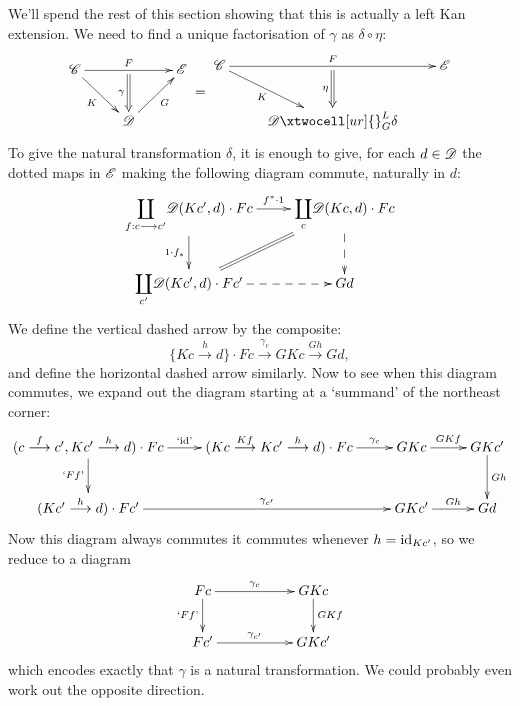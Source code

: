 \documentclass[11pt]{article}
\begin{document}
\begin{2. Kan Extensions}
We'll spend the rest of this section showing that this is actually a left Kan extension. We need %
to find a unique factorisation of $\gamma$ as $\delta\circ\eta$:
\[\vcenter{\xymatrix{
\scrC\ar[rd]_-{K}\ar[rr]^-{F}_-{}="arF"&%
&%
\scrE\\%
&%
\scrD\ar@{=>}"arF";[]_-{\gamma}
\ar[ur]_-{G}
}}
=
\vcenter{\xymatrix{
\scrC\ar[rd]_-{K}\ar[rr]^-{F}_-{}="arF"&%
&%
\scrE\\%
&%
\scrD\ar@{=>}"arF";[]_-{\eta}
\xtwocell[ur]{}_{G}^{L}{{\delta}}&%
}}
\]
To give the natural transformation $\delta$, it is enough to give, for each $d\in\mathscr{D}$ the dotted maps in $\mathscr{E}$ making the following diagram commute, naturally in $d$:
\[\vcenter{\xymatrix{
{\displaystyle\coprod_{f:c\to c'}}\scrD(Kc',d)\cdot Fc\ar[r]^-{f^*\cdot1}\ar[d]_-{1\cdot f_*}&%
\ar@{-->}[d]{\displaystyle\coprod_{c}}\scrD(Kc,d)\cdot Fc\ar@{=}[ld]\\%
\ar@{-->}[r]{\displaystyle\coprod_{c'}}\scrD(Kc',d)\cdot Fc'&%
Gd%
}}\]
We define the vertical dashed arrow by the composite:
\[\{Kc\overset{h}{\to}d\}\cdot Fc\overset{\gamma_c}{\to}GKc\overset{Gh}{\to}Gd,\]
and define the horizontal dashed arrow similarly. Now to see when this diagram commutes, we expand out the diagram starting at a `summand' of the northeast corner:
\[\vcenter{\xymatrix{
(c\overset{f}{\to}c',Kc'\overset{h}{\to}d)\cdot Fc\ar@{->}[r]^-{\textup{`id'}}
\ar[d]_-{\textup{`$Ff$'}}&%
\ar@{->}[r]^-{\gamma_c}(Kc\overset{Kf}{\to}Kc'\overset{h}{\to}d)\cdot Fc&%
GKc\ar[r]^-{GKf}&
GKc'\ar[d]^-{Gh}\\
\ar@{->}[rr]^-{\gamma_{c'}}(Kc'\overset{h}{\to}d)\cdot Fc'&&
GKc'\ar[r]^-{Gh}&Gd
}}\]
Now this diagram always commutes \Iff it commutes whenever $h=\textup{id}_{Kc'}$, so we reduce to a diagram
\[\vcenter{\xymatrix{
Fc\ar@{->}[rr]^-{\gamma_c}
\ar[d]_-{\textup{`$Ff$'}}&&%
GKc\ar[d]^-{GKf}\\
\ar@{->}[rr]^-{\gamma_{c'}}Fc'&&
GKc'
}}\]
which encodes exactly that $\gamma$ is a natural transformation. We could probably even work out the opposite direction.

\end{2. Kan Extensions}
\end{document}
